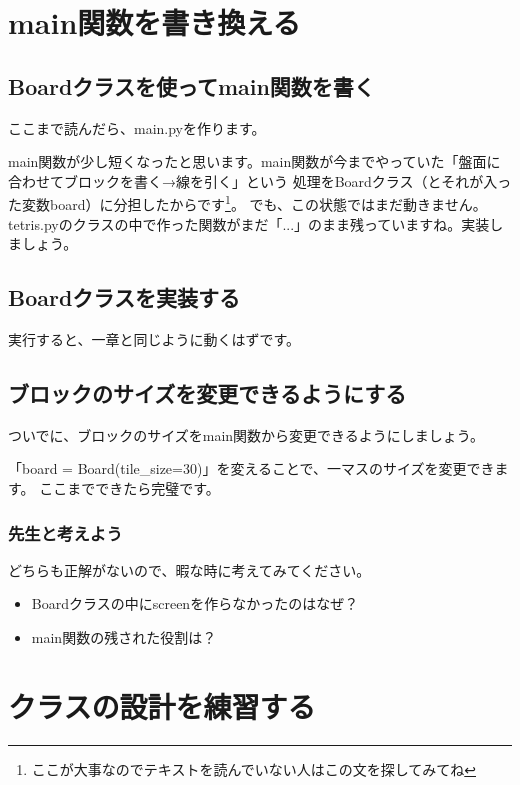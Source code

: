 \documentclass[12pt, a4paper, dvipdfmx]{book}
\begin{document}
\section{main関数を書き換える}
\subsection{Boardクラスを使ってmain関数を書く}
ここまで読んだら、main.pyを作ります。

main関数が少し短くなったと思います。main関数が今までやっていた「盤面に合わせてブロックを書く→線を引く」という
処理をBoardクラス（とそれが入った変数board）に分担したからです\footnote{ここが大事なのでテキストを読んでいない人はこの文を探してみてね}。
でも、この状態ではまだ動きません。tetris.pyのクラスの中で作った関数がまだ「...」のまま残っていますね。実装しましょう。
\subsection{Boardクラスを実装する}

実行すると、一章と同じように動くはずです。

\subsection{ブロックのサイズを変更できるようにする}
ついでに、ブロックのサイズをmain関数から変更できるようにしましょう。


「{board = Board(tile\_size=30)}」を変えることで、一マスのサイズを変更できます。
ここまでできたら完璧です。

\subsubsection{先生と考えよう}
どちらも正解がないので、暇な時に考えてみてください。
\begin{itemize}
  \item Boardクラスの中にscreenを作らなかったのはなぜ？
  \item main関数の残された役割は？
\end{itemize}

\newpage
\section{クラスの設計を練習する}
\end{document}
